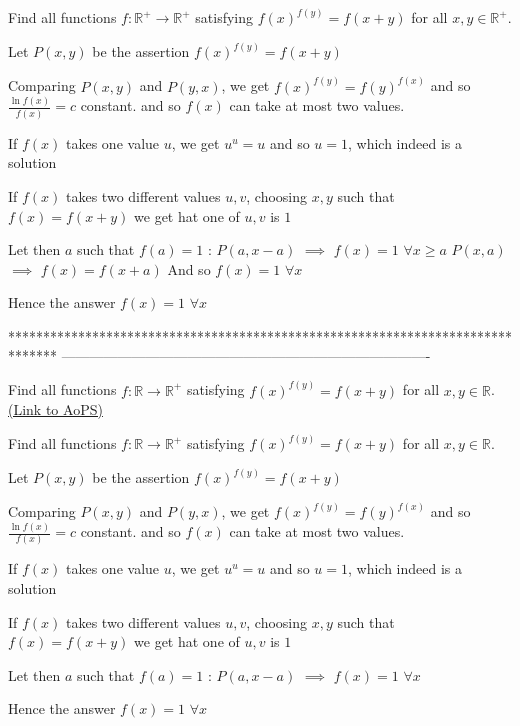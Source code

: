 \begin{solution}
	\begin{tcolorbox}Find all functions $f : \mathbb{R}^+ \rightarrow \mathbb{R}^+$ satisfying $f(x)^{f(y)} = f(x+y)$ for all $x,y \in \mathbb{R}^+$.\end{tcolorbox}
Let $P(x,y)$ be the assertion $f(x)^{f(y)}=f(x+y)$

Comparing $P(x,y)$ and $P(y,x)$, we get $f(x)^{f(y)}=f(y)^{f(x)}$ and so $\frac{\ln f(x)}{f(x)}=c$ constant. and so $f(x)$ can take at most two values.

If $f(x)$ takes one value $u$, we get $u^u=u$ and so $u=1$, which indeed is a solution

If $f(x)$ takes two different values $u,v$, choosing $x,y$ such that $f(x)=f(x+y)$ we get hat one of $u,v$ is $1$

Let then $a$ such that $f(a)=1$ :
$P(a,x-a)$ $\implies$ $f(x)=1$ $\forall x\ge a$
$P(x,a)$ $\implies$ $f(x)=f(x+a)$
And so $f(x)=1$ $\forall x$

Hence the answer $\boxed{f(x)=1}$ $\forall x$
\end{solution}
*******************************************************************************
-------------------------------------------------------------------------------

\begin{problem}
	Find all functions $f : \mathbb{R} \rightarrow \mathbb{R}^+$ satisfying $f(x)^{f(y)} = f(x+y)$ for all $x,y \in \mathbb{R}$.
	\flushright \href{https://artofproblemsolving.com/community/c6h480076}{(Link to AoPS)}
\end{problem}



\begin{solution}
	\begin{tcolorbox}Find all functions $f : \mathbb{R} \rightarrow \mathbb{R}^+$ satisfying $f(x)^{f(y)} = f(x+y)$ for all $x,y \in \mathbb{R}$.\end{tcolorbox}
Let $P(x,y)$ be the assertion $f(x)^{f(y)}=f(x+y)$


Comparing $P(x,y)$ and $P(y,x)$, we get $f(x)^{f(y)}=f(y)^{f(x)}$ and so $\frac{\ln f(x)}{f(x)}=c$ constant. and so $f(x)$ can take at most two values.

If $f(x)$ takes one value $u$, we get $u^u=u$ and so $u=1$, which indeed is a solution

If $f(x)$ takes two different values $u,v$, choosing $x,y$ such that $f(x)=f(x+y)$ we get hat one of $u,v$ is $1$

Let then $a$ such that $f(a)=1$ :
$P(a,x-a)$ $\implies$ $f(x)=1$ $\forall x$

Hence the answer $\boxed{f(x)=1}$ $\forall x$
\end{solution}



